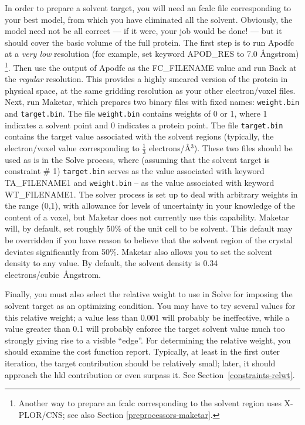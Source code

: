 \documentclass{report}
\begin{document}
In order to prepare a solvent target,
you will need an fcalc file corresponding to your best model,
from which you have eliminated all the solvent.  Obviously, the model
need not be all correct --- if it were, your job would be done! --- but it 
should cover the basic volume of the full protein.  The first step is to run
Apodfc at a {\em very low} resolution (for example, 
set keyword APOD\_RES to 7.0 \AA ngstrom)  
\footnote{Another way to prepare an fcalc
corresponding to the solvent region uses X-PLOR/CNS; 
see also Section {\ref{preprocessors-maketar}}.}.
Then use the output of Apodfc as the
FC\_FILENAME value and run Back 
at the {\em regular} resolution.
This provides a highly smeared version of the protein in physical space,
at the same gridding resolution as your other electron/voxel files.  
Next, run Maketar, which prepares two binary files
with fixed names: {\tt weight.bin} and {\tt target.bin}.  
The file {\tt weight.bin} contains weights of 0 or 1, where 1 indicates a 
solvent point and 0 indicates a protein point.  The file {\tt target.bin}
contains the target value associated with the solvent regions
(typically, the electron/voxel value corresponding to 
$\frac{1}{3}$ electrons/\AA$^3$).
These two files should be used as is in the Solve process, where (assuming that 
the solvent target is constraint \# 1) {\tt target.bin} serves as the value
associated with keyword
TA\_FILENAME1 and {\tt weight.bin} -- as the value associated with 
keyword WT\_FILENAME1.
The solver process is set up to deal with arbitrary weights in the 
range (0,1), with allowance for levels of uncertainty in your knowledge of the
content of a voxel, but Maketar does not currently use this 
capability.  Maketar  will, by default, set roughly 50\% of the 
unit cell to be solvent.  
This default may be overridden if you have reason to believe that the solvent
region of the crystal deviates significantly from 50\%.  
Maketar also allows
you to set the solvent density to any value.  By default, the solvent density
is 0.34 electrons/cubic~\AA ngstrom.

\vspace {0.1in}

Finally, you must also select the relative weight 
to use in Solve for imposing the solvent target as an optimizing condition.
You may have to try several values for this relative weight;
a value less than 0.001 will probably be ineffective, while a value greater 
than 0.1 will probably enforce the target solvent value much too strongly
giving rise to a visible ``edge''.
For determining the relative weight, you should examine the
cost function report.  Typically, at least in the
first outer iteration, the target contribution
should be relatively small; later, it should
approach the hkl contribution or even surpass it.
See Section~\ref{constraints-relwt}.
\end{document}
